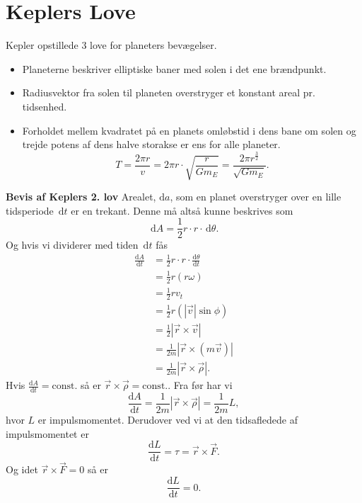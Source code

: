 \section{Keplers Love}
Kepler opstillede 3 love for planeters bevægelser.

\begin{sæt}
  \begin{itemize}
    \item Planeterne beskriver elliptiske baner med solen i det ene brændpunkt.
    \item Radiusvektor fra solen til planeten overstryger et konstant areal pr. tidsenhed.
    \item Forholdet mellem kvadratet på en planets omløbstid i dens bane om solen og trejde potens af dens halve storakse er ens for alle planeter.
      \[ 
        T = \frac{2\pi r}{v} = 2\pi r \cdot \sqrt{\frac{r}{Gm_E}} = \frac{2\pi r^{\frac{3}{2}}}{\sqrt{Gm_E}}
      .\]
\end{itemize}
\tcblower
\textbf{Bevis af Keplers 2. lov}
Arealet, $\mathrm{d}a$, som en planet overstryger over en lille tidsperiode $\, \mathrm{d}t$ er en trekant. Denne må altså kunne beskrives som
\[ 
\, \mathrm{d}A = \frac{1}{2}r\cdot r \cdot \, \mathrm{d}\theta
.\]
Og hvis vi dividerer med tiden $\, \mathrm{d}t$ fås
\begin{align*}
  \frac{\mathrm{d}A}{\mathrm{d}t} &= \frac{1}{2} r \cdot r \cdot \frac{\mathrm{d}\theta}{\mathrm{d}t} \\
  &= \frac{1}{2}r(r\omega) \\
  &= \frac{1}{2}rv_t \\
  &= \frac{1}{2}r(|\Vec{v}| \sin\phi) \\
  &= \frac{1}{2} \left| \Vec{r} \times \Vec{v} \right| \\
  &= \frac{1}{2m} \left| \Vec{r}\times(m \Vec{v}) \right| \\
  &= \frac{1}{2m} \left| \Vec{r} \times \Vec{\rho} \right|
.\end{align*}
Hvis $\frac{\mathrm{d}A}{\mathrm{d}t} = \mathrm{const.}$ så er $\Vec{r} \times \Vec{\rho} = \mathrm{const.}$. Fra før har vi
\[ 
  \frac{\mathrm{d}A}{\mathrm{d}t} = \frac{1}{2m} \left| \Vec{r} \times \Vec{\rho} \right| = \frac{1}{2m} L
,\]
hvor $L$ er impulsmomentet. Derudover ved vi at den tidsafledede af impulsmomentet er 
\[ 
\frac{\mathrm{d}L}{\mathrm{d}t} = \tau = \Vec{r} \times \Vec{F}
.\]
Og idet $\Vec{r} \times \Vec{F} = 0$ så er
\[ 
\frac{\mathrm{d}L}{\mathrm{d}t} = 0
.\]
\end{sæt}


